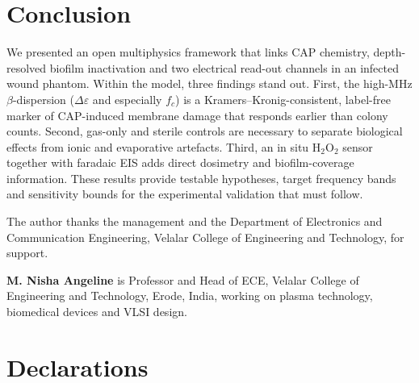 \documentclass[pdflatex,sn-mathphys-num]{sn-jnl}%
\begin{document}
\section{Conclusion}\label{sec:conclusion}

We presented an open multiphysics framework that links CAP chemistry, depth-resolved biofilm inactivation and two electrical read-out channels in an infected wound phantom. Within the model, three findings stand out. First, the high-MHz $\beta$-dispersion ($\Delta\varepsilon$ and especially $f_c$) is a Kramers--Kronig-consistent, label-free marker of CAP-induced membrane damage that responds earlier than colony counts. Second, gas-only and sterile controls are necessary to separate biological effects from ionic and evaporative artefacts. Third, an in situ H$_2$O$_2$ sensor together with faradaic EIS adds direct dosimetry and biofilm-coverage information. These results provide testable hypotheses, target frequency bands and sensitivity bounds for the experimental validation that must follow.

\backmatter

The author thanks the management and the Department of Electronics and Communication Engineering, Velalar College of Engineering and Technology, for support.

\noindent\textbf{M. Nisha Angeline} is Professor and Head of ECE, Velalar College of Engineering and Technology, Erode, India, working on plasma technology, biomedical devices and VLSI design.

\section*{Declarations}
\end{document}
